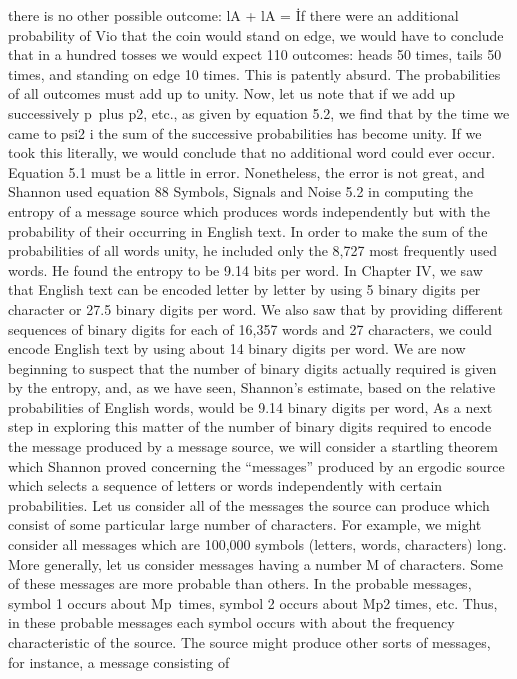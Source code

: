 there is no other possible outcome: lA + lA = \. If there were an
additional probability of Vio that the coin would stand on edge, we
would have to conclude that in a hundred tosses we would expect
110 outcomes: heads 50 times, tails 50 times, and standing on edge
10 times. This is patently absurd. The probabilities of all outcomes
must add up to unity. Now, let us note that if we add up successively
p\ plus p2, etc., as given by equation 5.2, we find that by the
time we came to psi2 i the sum of the successive probabilities has
become unity. If we took this literally, we would conclude that no
additional word could ever occur. Equation 5.1 must be a little in
error.
Nonetheless, the error is not great, and Shannon used equation
88
Symbols, Signals and Noise
5.2 in computing the entropy of a message source which produces
words independently but with the probability of their occurring in
English text. In order to make the sum of the probabilities of all
words unity, he included only the 8,727 most frequently used words.
He found the entropy to be 9.14 bits per word.
In Chapter IV, we saw that English text can be encoded letter
by letter by using 5 binary digits per character or 27.5 binary digits
per word. We also saw that by providing different sequences of
binary digits for each of 16,357 words and 27 characters, we could
encode English text by using about 14 binary digits per word. We
are now beginning to suspect that the number of binary digits
actually required is given by the entropy, and, as we have seen,
Shannon’s estimate, based on the relative probabilities of English
words, would be 9.14 binary digits per word,
As a next step in exploring this matter of the number of binary
digits required to encode the message produced by a message
source, we will consider a startling theorem which Shannon proved
concerning the “messages” produced by an ergodic source which
selects a sequence of letters or words independently with certain
probabilities.
Let us consider all of the messages the source can produce which
consist of some particular large number of characters. For example,
we might consider all messages which are 100,000 symbols
(letters, words, characters) long. More generally, let us consider
messages having a number M of characters. Some of these messages
are more probable than others. In the probable messages, symbol
1 occurs about Mp\ times, symbol 2 occurs about Mp2 times, etc.
Thus, in these probable messages each symbol occurs with about
the frequency characteristic of the source. The source might produce
other sorts of messages, for instance, a message consisting of
